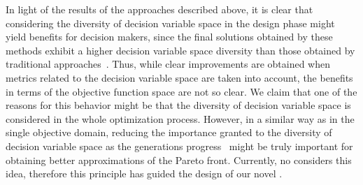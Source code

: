 In light of the results of the approaches described above, it is clear that considering the diversity of decision variable space
in the design phase might yield benefits for decision makers, since the final solutions obtained by these 
methods exhibit a higher decision variable space diversity than those obtained by traditional 
approaches~\citep{deb2005omni, rudolph2007capabilities}.
%
Thus, while clear improvements are obtained when metrics related to the decision 
variable space are taken into account, the benefits in terms of the 
objective function space are not so clear.
%
We claim that one of the reasons for this behavior might be that the diversity of decision variable space is considered 
in the whole optimization process.
%
However, in a similar way as in the single objective domain, reducing the importance granted to the diversity 
of decision variable space as the generations progress~\citep{Joel:MULTI_DYNAMIC} might be truly important for obtaining
better approximations of the Pareto front.
%
Currently, no \MOEA{} considers this idea, therefore this principle has guided the design of our novel \MOEA{}.


